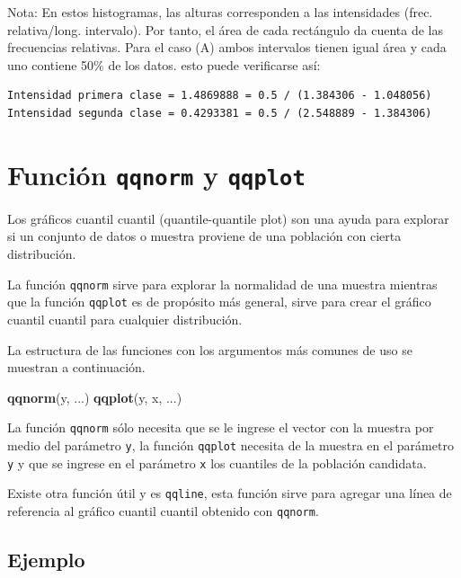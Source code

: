 \documentclass[10pt,]{krantz}
\makeatletter
\newenvironment{Shaded}{\begin{snugshade}}{\end{snugshade}}
\newcommand{\KeywordTok}[1]{\textcolor[rgb]{0.13,0.29,0.53}{\textbf{{#1}}}}
\newcommand{\NormalTok}[1]{{#1}}
\newenvironment{kframe}{%
\medskip{}
\setlength{\fboxsep}{.8em}
 \def\at@end@of@kframe{}%
 \ifinner\ifhmode%
  \def\at@end@of@kframe{\end{minipage}}%
  \begin{minipage}{\columnwidth}%
 \fi\fi%
 \def\FrameCommand##1{\hskip\@totalleftmargin \hskip-\fboxsep
 \colorbox{shadecolor}{##1}\hskip-\fboxsep
     \hskip-\linewidth \hskip-\@totalleftmargin \hskip\columnwidth}%
 \MakeFramed {\advance\hsize-\width
   \@totalleftmargin\z@ \linewidth\hsize
   \@setminipage}}%
 {\par\unskip\endMakeFramed%
 \at@end@of@kframe}
\renewenvironment{Shaded}{\begin{kframe}}{\end{kframe}}
\makeatother
\begin{document}
Nota: En estos histogramas, las alturas corresponden a las intensidades
(frec. relativa/long. intervalo). Por tanto, el área de cada rectángulo
da cuenta de las frecuencias relativas. Para el caso (A) ambos
intervalos tienen igual área y cada uno contiene 50\% de los datos. esto
puede verificarse así:

\begin{verbatim}
Intensidad primera clase = 1.4869888 = 0.5 / (1.384306 - 1.048056)
Intensidad segunda clase = 0.4293381 = 0.5 / (2.548889 - 1.384306)
\end{verbatim}

\section{\texorpdfstring{Función \texttt{qqnorm} y \texttt{qqplot}
}{Función qqnorm y qqplot  }}\label{funcion-qqnorm-y-qqplot}

Los gráficos cuantil cuantil (quantile-quantile plot) son una ayuda para
explorar si un conjunto de datos o muestra proviene de una población con
cierta distribución.

La función \texttt{qqnorm} sirve para explorar la normalidad de una
muestra mientras que la función \texttt{qqplot} es de propósito más
general, sirve para crear el gráfico cuantil cuantil para cualquier
distribución.

La estructura de las funciones con los argumentos más comunes de uso se
muestran a continuación.

\begin{Shaded}
\begin{Highlighting}[]
\KeywordTok{qqnorm}\NormalTok{(y, ...)}
\KeywordTok{qqplot}\NormalTok{(y, x, ...)}
\end{Highlighting}
\end{Shaded}

La función \texttt{qqnorm} sólo necesita que se le ingrese el vector con
la muestra por medio del parámetro \texttt{y}, la función
\texttt{qqplot} necesita de la muestra en el parámetro \texttt{y} y que
se ingrese en el parámetro \texttt{x} los cuantiles de la población
candidata.

Existe otra función útil y es \texttt{qqline}, esta función sirve para
agregar una línea de referencia al gráfico cuantil cuantil obtenido con
\texttt{qqnorm}.

\subsection*{Ejemplo}\label{ejemplo-3}
\end{document}
